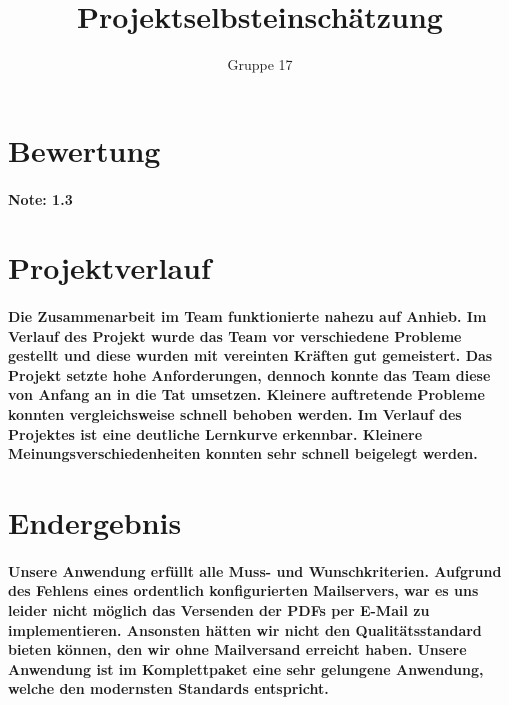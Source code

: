 \documentclass[a4paper]{article}
\author{Gruppe 17}
\date{}
\title{
\normalfont
\normalsize
\huge{Projektselbsteinschätzung}
}
\begin{document}
\maketitle

\newpage

\section*{Bewertung}
\paragraph{Note: 1.3}

\section*{Projektverlauf}
\paragraph{Die Zusammenarbeit im Team funktionierte nahezu auf Anhieb. Im Verlauf des Projekt wurde das Team vor verschiedene Probleme gestellt und diese wurden mit vereinten Kräften gut gemeistert. Das Projekt setzte hohe Anforderungen, dennoch konnte das Team diese von Anfang an in die Tat umsetzen. Kleinere auftretende Probleme konnten vergleichsweise schnell behoben werden. Im Verlauf des Projektes ist eine deutliche Lernkurve erkennbar. Kleinere Meinungsverschiedenheiten konnten sehr schnell beigelegt werden.}

\section*{Endergebnis}
\paragraph{Unsere Anwendung erfüllt alle Muss- und Wunschkriterien. Aufgrund des Fehlens eines ordentlich konfigurierten Mailservers, war es uns leider nicht möglich das Versenden der PDFs per E-Mail zu implementieren. Ansonsten hätten wir nicht den Qualitätsstandard bieten können, den wir ohne Mailversand erreicht haben. Unsere Anwendung ist im Komplettpaket eine sehr gelungene Anwendung, welche den modernsten Standards entspricht.}
\end{document}
